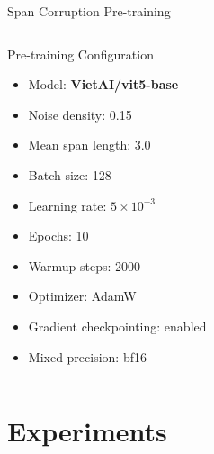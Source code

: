 \documentclass[10pt, aspectratio=169]{beamer}
\begin{document}
\begin{frame}[shrink=8]{Span Corruption Pre-training}
\begin{columns}[T]
    \begin{block}{Pre-training Configuration}
      \begin{itemize}
        \item Model: \textbf{VietAI/vit5-base}
        \item Noise density: 0.15
        \item Mean span length: 3.0
        \item Batch size: 128
        \item Learning rate: $5 \times 10^{-3}$
        \item Epochs: 10
        \item Warmup steps: 2000
        \item Optimizer: AdamW
        \item Gradient checkpointing: enabled
        \item Mixed precision: bf16
      \end{itemize}
    \end{block}
  \end{columns}
\end{frame}

\section{Experiments}
\end{document}
